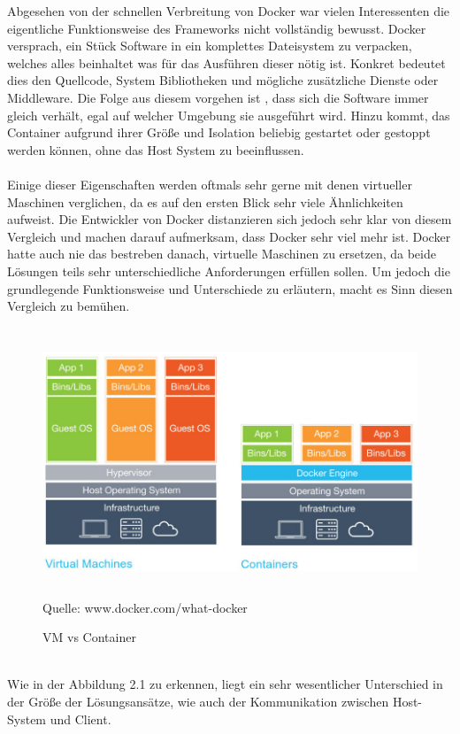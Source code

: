 \documentclass[12pt,toc=bib,toc=listof]{scrreprt}
\begin{document}
Abgesehen von der schnellen Verbreitung von Docker war vielen Interessenten die eigentliche Funktionsweise des Frameworks nicht vollständig bewusst.
Docker versprach, ein Stück Software in ein komplettes Dateisystem zu verpacken, welches alles beinhaltet was für das Ausführen dieser  nötig ist. 
Konkret bedeutet dies den Quellcode, System Bibliotheken und mögliche zusätzliche Dienste oder Middleware. 
Die Folge aus diesem vorgehen ist , dass sich die Software immer gleich verhält, egal auf welcher Umgebung sie ausgeführt wird. 
Hinzu kommt, das Container aufgrund ihrer Größe und Isolation  beliebig gestartet oder gestoppt werden können, ohne das Host System zu beeinflussen.\\
\\
Einige dieser Eigenschaften werden oftmals sehr gerne mit denen virtueller Maschinen verglichen, da es auf den ersten Blick sehr viele Ähnlichkeiten aufweist.
Die Entwickler von Docker distanzieren sich jedoch sehr klar von diesem Vergleich und machen darauf aufmerksam, dass Docker sehr viel mehr ist.
Docker hatte auch nie das bestreben danach, virtuelle Maschinen zu ersetzen, da beide Lösungen teils sehr unterschiedliche Anforderungen erfüllen sollen. 
Um jedoch die grundlegende Funktionsweise und Unterschiede zu erläutern, macht es Sinn diesen Vergleich zu bemühen.\\
\begin{figure}
	\centering
	\caption{VM vs Container}
	\includegraphics[width=15cm, height=8cm, scale=0.3]{dockerVM.jpg}
	Quelle: www.docker.com/what-docker
\end{figure}
\\
Wie in der Abbildung 2.1 zu erkennen, liegt ein sehr wesentlicher Unterschied in der Größe der Lösungsansätze, wie auch der Kommunikation zwischen Host-System und Client.
\end{document}
